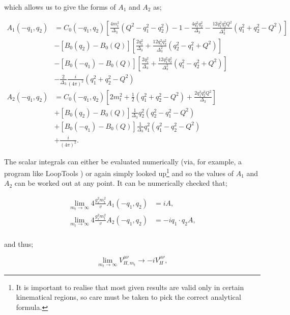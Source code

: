 which allows us to give the forms of $A_1$ and $A_2$ as;

\begin{equation}
\begin{split}
A_1(-q_1,q_2) &= C_0(-q_1,q_2) \left[\frac{4 m_t^2}{\Delta_3}(Q^2-q_1^2-q_2^2)-1-\frac{4q_1^2q_2^2}{\Delta_3} - \frac{12q_1^2q_2^2Q^2}{\Delta_3^2}(q_1^2+q_2^2-Q^2) \right] \\
&- \left[B_0(q_2)-B_0(Q) \right] \left[\frac{2 q_1^2}{\Delta_3} + \frac{12 q_1^2 q_2^2}{\Delta_3^2}(q_2^2-q_1^2+Q^2) \right] \\
& - \left[B_0(-q_1)-B_0(Q) \right] \left[\frac{2q_1^2}{\Delta_3} + \frac{12 q_1^2 q_2^2}{\Delta_3^2}(q_1^2-q_2^2+Q^2) \right] \\
& - \frac{2}{\Delta_3} \frac{i}{(4 \pi)^2}(q_1^2 + q_2^2 - Q^2) \\
A_2(-q_1,q_2) &=  C_0(-q_1,q_2) \left[2 m_t^2 + \frac{1}{2}(q_1^2+q_2^2-Q^2) + \frac{2 q_1^2 q_2^2Q^2}{\Delta_3} \right] \\
&+ \left[B_0(q_2)-B_0(Q) \right] \frac{1}{\Delta_3}q_2^2(q_2^2-q_1^2-Q^2) \\
& + \left[B_0(-q_1)-B_0(Q) \right] \frac{1}{\Delta_3}q_1^2(q_1^2-q_2^2-Q^2)\\
& +\frac{i}{(4 \pi)^2}.
\label{eqn:afuncs} 
\end{split}
\end{equation}

The scalar integrals can either be evaluated numerically (via, for example, a program like LoopTools \cite{Hahn1999}) or again simply looked up\footnote{It is important to realise that most given results are valid only in certain kinematical regions, so care must be taken to pick the correct analytical formula.} and so the values of $A_1$ and $A_2$ can be worked out at any point. It can be numerically checked that;

\begin{equation}
\begin{split}
\lim_{m_t \to \infty} 4 \frac{g_s^2 m_t^2}{v}A_1(-q_1,q_2) &= i A, \\
\lim_{m_t \to \infty} 4 \frac{g_s^2 m_t^2}{v}A_2(-q_1,q_2) &= -i q_1 \cdot q_2 A, \\
\end{split}
\end{equation}

and thus;

\begin{equation}
\lim_{m_t \to \infty}V^{\mu \nu}_{H, m_t} \to -i V^{\mu \nu}_H,
\end{equation}

